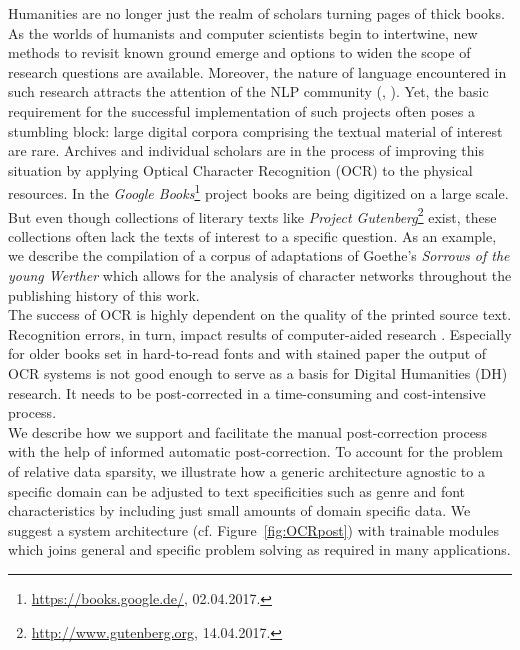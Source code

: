 \documentclass[11pt,letterpaper]{article}
\begin{document}
Humanities are no longer just the realm of scholars turning pages of thick books. 
As the worlds of humanists and computer scientists begin to intertwine, new methods 
to revisit known ground emerge and options to widen the scope of research questions are available. Moreover,
the nature of language encountered in such research attracts the attention of the NLP community (, ).
Yet, the basic requirement for the successful implementation of such projects often poses a stumbling block: large digital corpora comprising the textual material of interest are rare. Archives and individual scholars are in the process of improving this situation by applying Optical Character Recognition (OCR) to the physical resources. In the \textit{Google Books}\footnote{\url{https://books.google.de/}, 02.04.2017.} project books are being digitized on a large scale. But even though collections of literary texts like \textit{Project Gutenberg}\footnote{\url{http://www.gutenberg.org}, 14.04.2017.} exist, these collections often lack the texts of interest to a specific question. As an example, we describe the compilation of a corpus of adaptations of Goethe's \textit{Sorrows of the young Werther} which allows for the analysis of character networks throughout the publishing history of this work.\\
The success of OCR is highly dependent on the quality of the printed source text. Recognition errors, in turn,  impact results of computer-aided research \cite{Strange2014}. Especially for older books set in hard-to-read fonts and with stained paper the output of OCR systems is not good enough to serve as a basis for Digital Humanities (DH) research. It needs to be post-corrected in a time-consuming and cost-intensive process.\\
We describe how we support and facilitate the manual post-correction process with 
the help of informed automatic post-correction. 
To account for the problem of relative data sparsity, we illustrate how a generic architecture agnostic to a specific domain
can be adjusted to text specificities such as genre and font characteristics by including 
just small amounts of domain specific data. We suggest a system architecture (cf. Figure~\ref{fig:OCRpost}) with trainable modules which joins general and specific problem solving as required in many applications.
\end{document}
